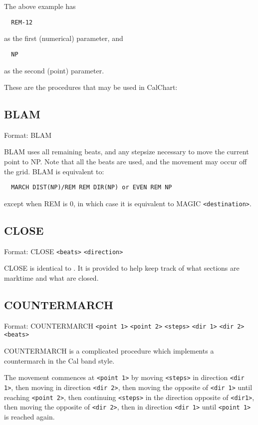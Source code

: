 The above example has
\begin{verbatim}
  REM-12
\end{verbatim}
as the first (numerical) parameter, and
\begin{verbatim}
  NP
\end{verbatim}
as the second (point) parameter.

These are the procedures that may be used in CalChart:

\subsection{BLAM}\label{blam}

Format: BLAM

BLAM uses all remaining beats, and any stepsize necessary to move the current
point to NP.  Note that all the beats are used, and the movement
may occur off the grid.  BLAM is equivalent to:
\begin{verbatim}
  MARCH DIST(NP)/REM REM DIR(NP) or EVEN REM NP
\end{verbatim}
except when REM is 0, in which case it is equivalent to
MAGIC \verb$<destination>$.

\subsection{CLOSE}\label{close}

Format: CLOSE \verb$<beats>$ \verb$<direction>$

CLOSE is identical to .  It is provided to help keep track
of what sections are marktime and what are closed.

\subsection{COUNTERMARCH}\label{countermarch}

Format: COUNTERMARCH \verb$<point 1>$ \verb$<point 2>$ \verb$<steps>$ \verb$<dir 1>$ \verb$<dir 2>$ \verb$<beats>$

COUNTERMARCH is a complicated procedure which implements a countermarch in
the Cal band style.

The movement commences at \verb$<point 1>$ by moving \verb$<steps>$ in
direction \verb$<dir 1>$, then moving in direction \verb$<dir 2>$, then
moving the opposite of \verb$<dir 1>$ until reaching \verb$<point 2>$,
then continuing \verb$<steps>$ in the direction opposite of \verb$<dir1>$,
then moving the opposite of \verb$<dir 2>$, then in direction \verb$<dir 1>$
until \verb$<point 1>$ is reached again.

